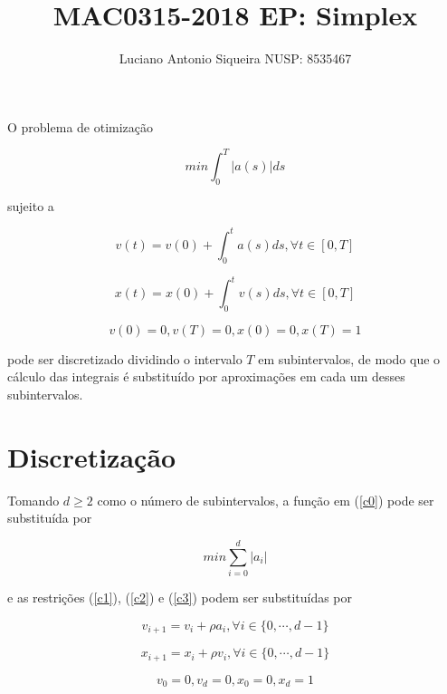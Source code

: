 \documentclass[10pt,oneside,a4paper]{article}
\title{MAC0315-2018 EP: Simplex}
\author{Luciano Antonio Siqueira NUSP: 8535467}
\date{}
\begin{document}
 
\maketitle

O problema de otimização

\begin{equation}
\label{c0}
min \int_{0}^{T}|a(s)|ds
\end{equation}

\noindent
sujeito a

\begin{equation}
\label{c1}
v(t) = v(0) + \int_{0}^{t}a(s)ds, \forall t \in [0,T]
\end{equation}

\begin{equation}
\label{c2}
x(t) = x(0) + \int_{0}^{t}v(s)ds, \forall t \in [0,T]
\end{equation}

\begin{equation}
\label{c3}
v(0) = 0, v(T) = 0, x(0) = 0, x(T) = 1
\end{equation}

\noindent
pode ser discretizado dividindo o intervalo $T$ em subintervalos, de modo que o cálculo das integrais é substituído por aproximações em cada um desses subintervalos.

\section{Discretização}

Tomando $d \ge 2$ como o número de subintervalos, a função em (\ref{c0}) pode ser substituída por

\begin{equation}
\label{d0}
min \sum_{i=0}^{d}|a_i|
\end{equation}

\noindent
e as restrições (\ref{c1}), (\ref{c2}) e (\ref{c3}) podem ser substituídas por

\begin{equation}
\label{d1}
v_{i+1} = v_i + \rho a_i, \forall i \in \{0, \dotsm, d-1\}
\end{equation}

\begin{equation}
\label{d2}
x_{i+1} = x_i + \rho v_i, \forall i \in \{0, \dotsm, d-1\}
\end{equation}

\begin{equation}
\label{d3}
v_0 = 0, v_d = 0, x_0 = 0, x_d = 1
\end{equation}
\end{document}
